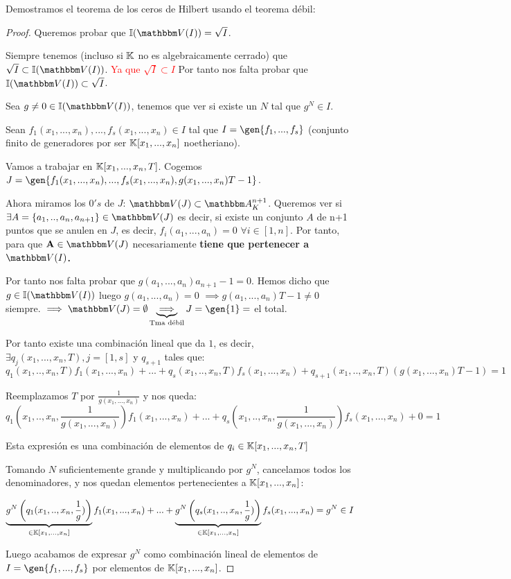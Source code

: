 Demostramos el teorema de los ceros de Hilbert usando el teorema débil:
\begin{proof}
	Queremos probar que $\I(\V(I))=\sqrt{I}$.

	Siempre tenemos (incluso si $\mathbb{K}$ no es algebraicamente cerrado) que $\sqrt{I} \subset \I(\V(I))$. \textcolor{red}{Ya que $\sqrt{I} \subset I$} Por tanto nos falta probar que $\I(\V(I)) \subset \sqrt{I}$.
	
	Sea $g \neq 0 \in \I(\V(I))$, tenemos que ver si existe un $N$ tal que $g^N \in I$.
	
	Sean $f_1(x_1,...,x_n),...,f_s(x_1,...,x_n) \in I$ tal que $I=\gen{f_1,...,f_s}$ (conjunto finito de generadores por ser $\mathbb{K}[x_1,...,x_n]$ noetheriano).
	
	Vamos a trabajar en $\mathbb{K}[x_1,...,x_n,T]$. Cogemos $J=\gen{f_1(x_1,...,x_n),...,f_s(x_1,...,x_n), g(x_1,...,x_n)T-1}$.
	
	Ahora miramos los $0's$ de $J$: $\V(J) \subset \A^{n+1}_K$. Queremos ver si $\exists A=\{a_1,..,a_n,a_{n+1} \} \in \V(J)$ es decir, si existe un conjunto $A$ de n+1 puntos que se anulen en $J$, es decir, $f_i(a_1,...,a_n)=0$ $\forall i \in [1,n]$. Por tanto, para que $\textbf{A} \in \V(J)$ necesariamente \textbf{tiene que pertenecer a $\V(I)$.}
	
	Por tanto nos falta probar que $g(a_1,...,a_n)a_{n+1}-1=0$. Hemos dicho que $g \in \I(\V(I))$ luego $g(a_1,...,a_n)=0$ $\implies g(a_1,...,a_n)T-1\neq 0$ siempre. $\implies \V(J)=\emptyset \underbrace{\implies}_{\text{Tma débil}} J=\gen{1}=$ el total.
	
	Por tanto existe una combinación lineal que da $1$, es decir,  $\exists q_j(x_1,...,x_n,T), j=[1,s]$ y $q_{s+1}$ tales que:
	$$ q_1(x_1,..,x_n,T)f_1(x_1,...,x_n)+...+q_s(x_1,..,x_n,T)f_s(x_1,...,x_n) + q_{s+1}(x_1,..,x_n,T)(g(x_1,...,x_n)T-1)=1 $$
	
	Reemplazamos $T$ por $\frac{1}{g(x_1,...,x_n)}$ y nos queda:
	$$ q_1(x_1,..,x_n, \frac{1}{g(x_1,...,x_n)})f_1(x_1,...,x_n)+...+q_s(x_1,..,x_n,\frac{1}{g(x_1,...,x_n)})f_s(x_1,...,x_n)+0=1 $$
	
	Esta expresión es una combinación de elementos de $q_i \in \mathbb{K}[x_1,...,x_n,T]$
	
	Tomando $N$ suficientemente grande y multiplicando por $g^N$, cancelamos todos los denominadores, y nos quedan elementos pertenecientes a $\mathbb{K}[x_1,...,x_n]$:
	
	$$ \underbrace{g^N\left(q_1(x_1,..,x_n, \frac{1}{g})\right)}_{\in \mathbb{K}[x_1,...,x_n]}f_1(x_1,...,x_n)+...+ \underbrace{g^N \left( q_s(x_1,..,x_n,\frac{1}{g})\right)}_{\in \mathbb{K}[x_1,...,x_n]}f_s(x_1,...,x_n) =g^N \in I $$
	
	Luego acabamos de expresar $g^N$ como combinación lineal de elementos de $I=\gen{f_1,...,f_s}$ por elementos de $\mathbb{K}[x_1,...,x_n]$.
\end{proof}


